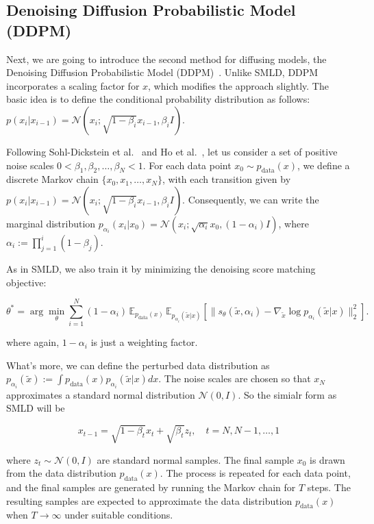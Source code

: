 \subsection{ Denoising Diffusion Probabilistic Model (DDPM)}
Next, we are going to introduce the second method for diffusing models, the Denoising Diffusion Probabilistic Model (DDPM)~\cite{DDPM_2020}. Unlike SMLD, DDPM incorporates a scaling factor for \( x \), which modifies the approach slightly. The basic idea is to define the conditional probability distribution as follows: \( p(x_i | x_{i-1}) = \mathcal{N} \left( x_i ; \sqrt{1 - \beta_i} x_{i-1}, \beta_i I \right) \).

Following Sohl-Dickstein et al.~\cite{Dickstein2015} and Ho et al.~\cite{DDPM_2020}, let us consider a set of positive noise scales \( 0 < \beta_1, \beta_2, \dots, \beta_N < 1 \). For each data point \( x_0 \sim p_{\text{data}}(x) \), we define a discrete Markov chain \( \{x_0, x_1, \dots, x_N\} \), with each transition given by \( p(x_i | x_{i-1}) = \mathcal{N} \left( x_i ; \sqrt{1 - \beta_i} x_{i-1}, \beta_i I \right) \). Consequently, we can write the marginal distribution \( p_{\alpha_i}(x_i | x_0) = \mathcal{N} \left( x_i ; \sqrt{\alpha_i} x_0, (1 - \alpha_i) I \right) \), where \( \alpha_i := \prod_{j=1}^i (1 - \beta_j) \).

As in SMLD, we also train it by minimizing the denoising score matching objective:

\begin{equation}
\theta^* = \arg \min_{\theta} \sum_{i=1}^{N} (1-\alpha_i) \, \mathbb{E}_{p_{\text{data}}(x)} \, \mathbb{E}_{p_{\alpha_i}(\tilde{x} | x)} \left[ \| s_\theta(\tilde{x}, \alpha_i) - \nabla_{\tilde{x}} \log p_{\alpha_i}(\tilde{x} | x) \|_2^2 \right].
\end{equation}

where again, $1-\alpha_i$ is just a weighting factor.

What's more, we can define the perturbed data distribution as \( p_{\alpha_i}(\tilde{x}) := \int p_{\text{data}}(x) p_{\alpha_i}(\tilde{x} | x) dx \). The noise scales are chosen so that \( x_N \) approximates a standard normal distribution \( \mathcal{N}(0, I) \). So the simialr form as SMLD will be 

\begin{equation}
    x_{t-1} = \sqrt{1 - \beta_t} x_t + \sqrt{\beta_t} z_t, \quad t = N, N-1, \dots, 1  
\end{equation}

where \( z_t \sim \mathcal{N}(0, I) \) are standard normal samples. The final sample \( x_0 \) is drawn from the data distribution \( p_{\text{data}}(x) \). The process is repeated for each data point, and the final samples are generated by running the Markov chain for \( T \) steps. The resulting samples are expected to approximate the data distribution \( p_{\text{data}}(x) \) when \( T \to \infty \) under suitable conditions.
